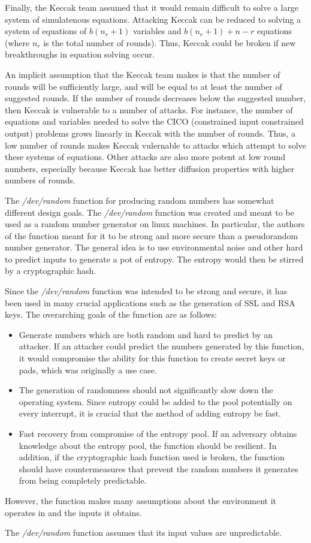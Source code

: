 \documentclass[psamsfonts]{amsart}
\begin{document}
Finally, the Keccak team assumed that it would remain difficult to solve a large system of simulatenous equations. Attacking Keccak can be reduced to solving a system of equations of $b(n_r + 1)$ variables and $b(n_r+1) + n -r$ equations (where $n_r$ is the total number of rounds). Thus, Keccak could be broken if new breakthroughs in equation solving occur.

An implicit assumption that the Keccak team makes is that the number of rounds will be sufficiently large, and will be equal to at least the number of suggested rounds. If the number of rounds decreases below the suggested number, then Keccak is vulnerable to a number of attacks. For instance, the number of equations and variables needed to solve the CICO (constrained input constrained output) problems grows linearly in Keccak with the number of rounds. Thus, a low number of rounds makes Keccak vulernable to attacks which attempt to solve these systems of equations. Other attacks are also more potent at low round numbers, especially because Keccak has better diffusion properties with higher numbers of rounds.

The \emph{/dev/random} function for producing random numbers has somewhat different design goals. The \emph{/dev/random} function was created and meant to be used as a random number generator on linux machines. In particular, the authors of the function meant for it to be strong and more secure than a pseudorandom number generator. The general idea is to use environmental noise and other hard to predict inputs to generate a pot of entropy. The entropy would then be stirred by a cryptographic hash.

Since the \emph{/dev/random} function was intended to be strong and secure, it has been used in many crucial applications such as the generation of SSL and RSA keys. The overarching goals of the function are as follows:
\begin{itemize}
  \item Generate numbers which are both random and hard to predict by an attacker. If an attacker could predict the numbers generated by this function, it would compromise the ability for this function to create secret keys or pads, which was originally a use case.
  \item The generation of randomness should not significantly slow down the operating system. Since entropy could be added to the pool potentially on every interrupt, it is crucial that the method of adding entropy be fast.
  \item Fast recovery from compromise of the entropy pool. If an adversary obtains knowledge about the entropy pool, the function should be resilient. In addition, if the cryptographic hash function used is broken, the function should have countermeasures that prevent the random numbers it generates from being completely predictable.
\end{itemize}

However, the function makes many assumptions about the environment it operates in and the inputs it obtains. 

The \emph{/dev/random} function assumes that its input values are unpredictable.
\end{document}
